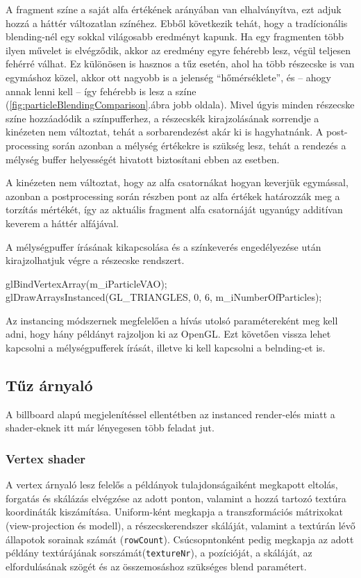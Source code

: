 A fragment színe a saját alfa értékének arányában van elhalványítva, ezt adjuk hozzá a háttér változatlan színéhez. Ebből következik tehát, hogy a tradícionális blending-nél egy sokkal világosabb eredményt kapunk. Ha egy fragmenten több ilyen művelet is elvégződik, akkor az eredmény egyre fehérebb lesz, végül teljesen fehérré válhat. Ez különösen is hasznos a tűz esetén, ahol ha több részecske is van egymáshoz közel, akkor ott nagyobb is a jelenség ``hőmérséklete'', és -- ahogy annak lenni kell -- így fehérebb is lesz a színe (\ref{fig:particleBlendingComparison}.ábra jobb oldala). Mivel úgyis minden részecske színe hozzáadódik a színpufferhez, a részecskék kirajzolásának sorrendje a kinézeten nem változtat, tehát a sorbarendezést akár ki is hagyhatnánk. A post-processing során azonban a mélység értékekre is szükség lesz, tehát a rendezés a mélység buffer helyességét hivatott biztosítani ebben az esetben.

A kinézeten nem változtat, hogy az alfa csatornákat hogyan keverjük egymással, azonban a postprocessing során részben pont az alfa értékek határozzák meg a torzítás mértékét, így az aktuális fragment alfa csatornáját ugyanúgy additívan keverem a háttér alfájával.

A mélységpuffer írásának kikapcsolása és a színkeverés engedélyezése után kirajzolhatjuk végre a részecske rendszert.
\begin{cpp}
glBindVertexArray(m_iParticleVAO);
glDrawArraysInstanced(GL_TRIANGLES, 0, 6, m_iNumberOfParticles);
\end{cpp}
Az instancing módszernek megfelelően a hívás utolsó paramétereként meg kell adni, hogy hány példányt rajzoljon ki az OpenGL. Ezt követően vissza lehet kapcsolni a mélységpufferek írását, illetve ki kell kapcsolni a belnding-et is.

\subsection{Tűz árnyaló}
A billboard alapú megjelenítéssel ellentétben az instanced render-elés miatt a shader-eknek itt már lényegesen több feladat jut. 

\subsubsection{Vertex shader}
A vertex árnyaló lesz felelős a példányok tulajdonságaiként megkapott eltolás, forgatás és skálázás elvégzése az adott ponton, valamint a hozzá tartozó textúra koordináták kiszámítása. Uniform-ként megkapja a transzformációs mátrixokat (view-projection és modell), a részecskerendszer skáláját, valamint a textúrán lévő állapotok sorainak számát (\texttt{rowCount}). Csúcsopntonként pedig megkapja az adott példány textúrájának sorszámát(\texttt{textureNr}), a pozícióját, a skáláját, az elfordulásának szögét és az összemosáshoz szükséges blend paramétert. 

